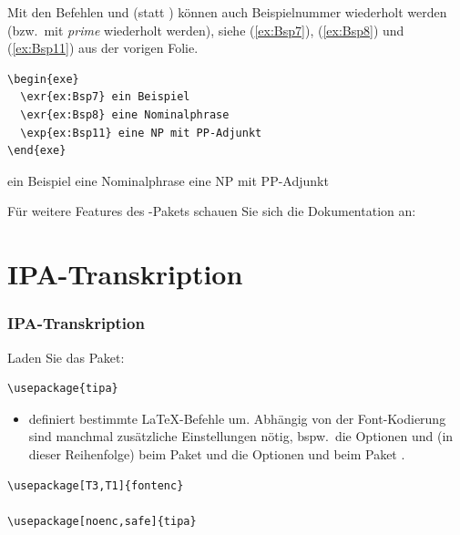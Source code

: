 \begin{frame}[fragile]

Mit den Befehlen  und  (statt ) können auch Beispielnummer wiederholt werden (bzw.\ mit \emph{prime} wiederholt werden), siehe (\ref{ex:Bsp7}), (\ref{ex:Bsp8}) und (\ref{ex:Bsp11}) aus der vorigen Folie.

\begin{lstlisting}
\begin{exe}
  \exr{ex:Bsp7} ein Beispiel 
  \exr{ex:Bsp8} eine Nominalphrase 
  \exp{ex:Bsp11} eine NP mit PP-Adjunkt
\end{exe}

\end{lstlisting}

\begin{exe}
	 ein Beispiel 
	 eine Nominalphrase 
	 eine NP mit PP-Adjunkt
\end{exe}

\end{frame}


\begin{frame}

Für weitere Features des -Pakets schauen Sie sich die Dokumentation an: \citet{Kolb&Co10a}

\end{frame}


\section{IPA-Transkription}

\begin{frame}[fragile]
\frametitle{IPA-Transkription}

Laden Sie das Paket:

\begin{lstlisting}
\usepackage{tipa}
\end{lstlisting}

\begin{itemize}
	\item {} definiert bestimmte \LaTeX -Befehle um. Abhängig von der Font-Kodierung sind manchmal zusätzliche Einstellungen nötig, bspw.\ die Optionen  und  (in dieser Reihenfolge) beim Paket  und die Optionen  und  beim Paket .
\end{itemize}

\begin{lstlisting}
\usepackage[T3,T1]{fontenc}

\usepackage[noenc,safe]{tipa}	
\end{lstlisting}

\end{frame}


